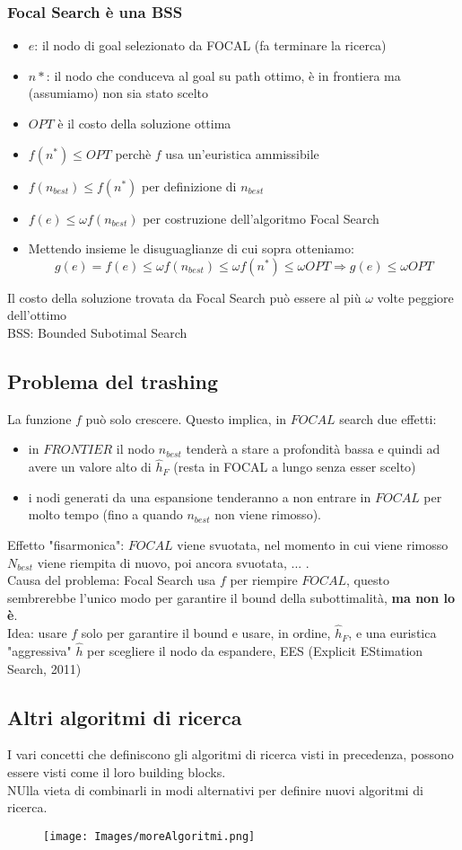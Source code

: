 \documentclass{article}
\begin{document}
\subsubsection{Focal Search è una BSS}
\begin{itemize}
\item $e$: il nodo di goal selezionato da FOCAL (fa terminare la ricerca)
\item $n*$: il nodo che conduceva al goal su path ottimo, è in frontiera ma (assumiamo) non sia stato scelto
\item $OPT$ è il costo della soluzione ottima
\item $f(n^*)\leq OPT$ perchè $f$ usa un'euristica ammissibile
\item $f(n_{best}) \leq f(n^*)$ per definizione di $n_{best}$
\item $f(e)\leq \omega f(n_{best})$ per costruzione dell'algoritmo Focal Search
\item Mettendo insieme le disuguaglianze di cui sopra otteniamo: \[ g(e)=f(e)\leq \omega f(n_{best})\leq\omega f(n^*) \leq \omega OPT \Rightarrow g(e) \leq \omega OPT \]
\end{itemize}
Il costo della soluzione trovata da Focal Search può essere al più $\omega$ volte peggiore dell'ottimo
\\ BSS: Bounded Subotimal Search
\subsection{Problema del trashing}
La funzione $f$ può solo crescere. Questo implica, in $FOCAL$ search due effetti:
\begin{itemize}
    \item in $FRONTIER$ il nodo $n_{best}$ tenderà a stare a profondità bassa e quindi ad avere un valore alto di $\hat{h}_F$ (resta in FOCAL a lungo senza esser scelto)
    \item i nodi generati da una espansione tenderanno a non entrare in $FOCAL$ per molto tempo (fino a quando $n_{best}$ non viene rimosso).
\end{itemize}
Effetto "fisarmonica": $FOCAL$ viene svuotata, nel momento in cui viene rimosso $N_{best}$ viene riempita di nuovo, poi ancora svuotata, ... .
\\ Causa del problema: Focal Search usa $f$ per riempire $FOCAL$, questo sembrerebbe l'unico modo per garantire il bound della subottimalità, \textbf{ma non lo è}.
\\ Idea: usare $f$ solo per garantire il bound e usare, in ordine, $\hat{h}_F$, e una euristica "aggressiva" $\hat{h}$ per scegliere il nodo da espandere, EES (Explicit EStimation Search, 2011)
\subsection{Altri algoritmi di ricerca}
I vari concetti che definiscono gli algoritmi di ricerca visti in precedenza, possono essere visti come il loro building blocks.
\\ NUlla vieta di combinarli in modi alternativi per definire nuovi algoritmi di ricerca.
\begin{figure}[H]
    \centering
    \texttt{[image: Images/moreAlgoritmi.png]}
\end{figure}
\end{document}
